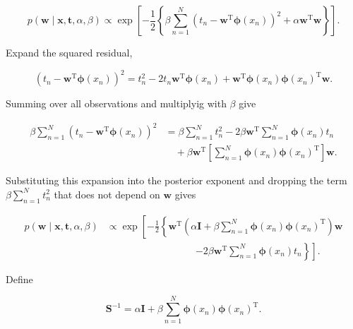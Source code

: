 \documentclass[10pt,twocolumn]{memoir}
\begin{document}
\begin{equation}
    p(\mathbf{w}\mid\mathbf{x},\mathbf{t},\alpha,\beta)\propto\exp\left[-\frac{1}{2}\left\{\beta\sum_{n=1}^{N}\left(t_n-\mathbf{w}^{\mathrm{T}}\boldsymbol{\phi}(x_n)\right)^2 + \alpha\mathbf{w}^{\mathrm{T}}\mathbf{w}\right\}\right].
\end{equation}

Expand the squared residual,

\begin{equation}
    \left(t_n-\mathbf{w}^{\mathrm{T}}\boldsymbol{\phi}(x_n)\right)^2 = t_n^2 - 2t_n\mathbf{w}^{\mathrm{T}}\boldsymbol{\phi}(x_n) + \mathbf{w}^{\mathrm{T}}\boldsymbol{\phi}(x_n)\boldsymbol{\phi}(x_n)^{\mathrm{T}}\mathbf{w}.
\end{equation}

Summing over all observations and multiplyig with $\beta$ give

\begin{equation}
\begin{aligned}
    \beta\sum_{n=1}^{N}\left(t_n-\mathbf{w}^{\mathrm{T}}\boldsymbol{\phi}(x_n)\right)^2
    &=
    \beta\sum_{n=1}^{N}t_n^2 -2\beta\mathbf{w}^{\mathrm{T}}\sum_{n=1}^{N}\boldsymbol{\phi}(x_n)t_n \\
    &\quad+
    \beta\mathbf{w}^{\mathrm{T}}\left[\sum_{n=1}^{N}\boldsymbol{\phi}(x_n)\boldsymbol{\phi}(x_n)^{\mathrm{T}}\right]\mathbf{w}.
\end{aligned}
\end{equation}

Substituting this expansion into the posterior exponent and dropping the term $\beta\sum_{n=1}^{N}t_n^2$ that does not depend on $\mathbf{w}$ gives

\begin{equation}
\begin{aligned}
    p(\mathbf{w}\mid\mathbf{x},\mathbf{t},\alpha,\beta)
    &\propto \exp\left[-\frac{1}{2}\left\{
    \mathbf{w}^{\mathrm{T}}\left(\alpha\mathbf{I}+\beta\sum_{n=1}^{N}\boldsymbol{\phi}(x_n)\boldsymbol{\phi}(x_n)^{\mathrm{T}}\right)\mathbf{w}\right.\right. \\
    &\qquad\qquad\qquad\qquad\quad
    \left.\left.-2\beta\mathbf{w}^{\mathrm{T}}\sum_{n=1}^{N}\boldsymbol{\phi}(x_n)t_n
    \right\}\right].
\end{aligned}
\end{equation}

Define

\begin{equation}
    \mathbf{S}^{-1} = \alpha\mathbf{I} + \beta\sum_{n=1}^{N}\boldsymbol{\phi}(x_n)\boldsymbol{\phi}(x_n)^{\mathrm{T}}.
\end{equation}
\end{document}
